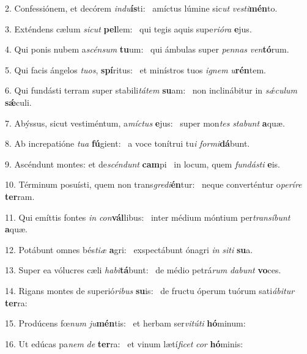2. Confessiónem, et decórem \textit{ind}\textit{u}\textbf{ís}ti: \ast\  amíctus lúmine sic\textit{ut} \textit{ves}\textit{ti}\textbf{mén}to.\

3. Exténdens cælum \textit{sic}\textit{ut} \textbf{pel}lem: \ast\  qui tegis aquis supe\textit{ri}\textit{ó}\textit{ra} \textbf{e}jus.\

4. Qui ponis nubem a\textit{scén}\textit{sum} \textbf{tu}um: \ast\  qui ámbulas super \textit{pen}\textit{nas} \textit{ven}\textbf{tó}rum.\

5. Qui facis ángelos \textit{tu}\textit{os}, \textbf{spí}ritus: \ast\  et minístros tuos \textit{i}\textit{gnem} \textit{u}\textbf{rén}tem.\

6. Qui fundásti terram super stabili\textit{tá}\textit{tem} \textbf{su}am: \ast\  non inclinábitur in \textit{sǽ}\textit{cu}\textit{lum} \textbf{sǽ}culi.\

7. Abýssus, sicut vestiméntum, a\textit{míc}\textit{tus} \textbf{e}jus: \ast\  super mon\textit{tes} \textit{sta}\textit{bunt} \textbf{a}quæ.\

8. Ab increpatióne \textit{tu}\textit{a} \textbf{fú}gient: \ast\  a voce tonítrui tu\textit{i} \textit{for}\textit{mi}\textbf{dá}bunt.\

9. Ascéndunt montes: et de\textit{scén}\textit{dunt} \textbf{cam}pi \ast\  in locum, quem \textit{fun}\textit{dás}\textit{ti} \textbf{e}is.\

10. Términum posuísti, quem non trans\textit{gre}\textit{di}\textbf{én}tur: \ast\  neque converténtur o\textit{pe}\textit{rí}\textit{re} \textbf{ter}ram.\

11. Qui emíttis fontes \textit{in} \textit{con}\textbf{vál}libus: \ast\  inter médium móntium per\textit{trans}\textit{í}\textit{bunt} \textbf{a}quæ.\

12. Potábunt omnes bés\textit{ti}\textit{æ} \textbf{a}gri: \ast\  exspectábunt ónagri \textit{in} \textit{si}\textit{ti} \textbf{su}a.\

13. Super ea vólucres cæli \textit{ha}\textit{bi}\textbf{tá}bunt: \ast\  de médio petrá\textit{rum} \textit{da}\textit{bunt} \textbf{vo}ces.\

14. Rigans montes de superió\textit{ri}\textit{bus} \textbf{su}is: \ast\  de fructu óperum tuórum sati\textit{á}\textit{bi}\textit{tur} \textbf{ter}ra:\

15. Prodúcens fœ\textit{num} \textit{ju}\textbf{mén}tis: \ast\  et herbam ser\textit{vi}\textit{tú}\textit{ti} \textbf{hó}minum:\

16. Ut edúcas pa\textit{nem} \textit{de} \textbf{ter}ra: \ast\  et vinum lætí\textit{fi}\textit{cet} \textit{cor} \textbf{hó}minis:\

